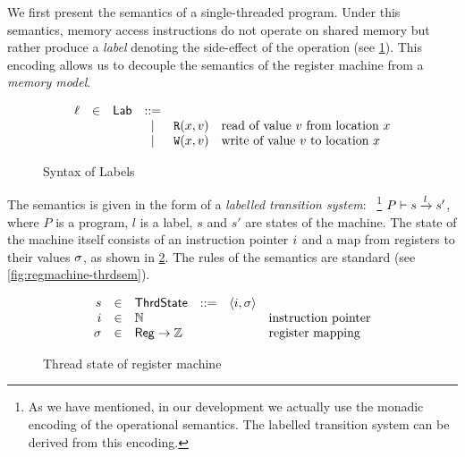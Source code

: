 We first present the semantics of a single-threaded program.
Under this semantics, memory access instructions 
do not operate on shared memory
but rather produce a \emph{label}
denoting the side-effect of the operation 
(see \cref{fig:label-syntax}).
This encoding allows us to decouple 
the semantics of the register machine 
from a \emph{memory model}.

\begin{figure}[h!]
\[
\begin{array}{rclclll}

  \ell &\in& \mathsf{Lab}  &::=&                                & \text{}             \\
              & &  & | & {\mathtt{R}}({x},{v})                    & \text{read of value $v$ from location $x$}   \\
              & &  & | & {\mathtt{W}}({x},{v})                    & \text{write of value $v$ to location $x$}    \\

\end{array}
\] 
\caption{Syntax of Labels}
\label{fig:label-syntax}
\end{figure}

The semantics is given in the form of a
\emph{labelled transition system}:~%
\footnote{As we have mentioned, in our \coq development we actually use 
the monadic encoding of the operational semantics. 
The labelled transition system can be derived from this encoding.}
$P \vdash s \xrightarrow{l} s'$,
where $P$ is a program, $l$ is a label, $s$ and $s'$ are states of the machine. 
The state of the machine itself consists of an instruction pointer $i$
and a map from registers to their values $\sigma$, 
as shown in \cref{fig:regmachine-thrdstate}. 
The rules of the semantics are standard 
(see \cref{fig:regmachine-thrdsem}).

\begin{figure}[h!]
\[
\begin{array}{rclclll}

  s          &\in& \mathsf{ThrdState}    &::=& \langle i, \sigma \rangle &                         \\
  i     &\in& {\mathbb{N}}            &   &                    & \text{instruction pointer} \\
  \sigma    &\in& \mathsf{Reg} \rightarrow {\mathbb{Z}}  &   &                    & \text{register mapping}   \\

\end{array}
\] 
\caption{Thread state of register machine}
\label{fig:regmachine-thrdstate}
\end{figure}


